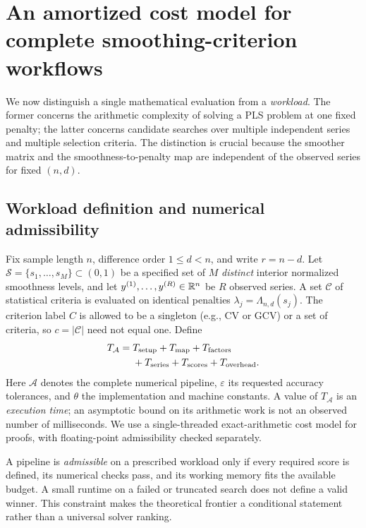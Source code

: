 \section{An amortized cost model for complete smoothing-criterion workflows}
\label{sec:amortized}
We now distinguish a single mathematical evaluation from a
\emph{workload}. The former concerns the arithmetic complexity of
solving a PLS problem at one fixed penalty; the latter concerns
candidate searches over multiple independent series and multiple
selection criteria. The distinction is crucial because the
smoother matrix and the smoothness-to-penalty map are independent
of the observed series for fixed $(n,d)$.

\subsection{Workload definition and numerical admissibility}
Fix sample length $n$, difference order $1\le d<n$, and write
$r=n-d$. Let $\mathcal{S}=\{s_1,\ldots,s_M\}\subset(0,1)$
be a specified set of $M$ \emph{distinct} interior normalized
smoothness levels, and let $y^{(1)},\ldots,y^{(R)}\in\mathbb R^n$
be $R$ observed series. A set $\mathcal C$ of statistical
criteria is evaluated on identical penalties
$\lambda_j=\Lambda_{n,d}(s_j)$.
The criterion label $C$ is allowed to be a singleton
(e.g., CV or GCV) or a set of criteria, so
$c=|\mathcal C|$ need not equal one. Define
\begin{equation}\label{eq:theory_cost_function}
\begin{aligned}
T_{\mathcal A}
={}&T_{\rm setup}+T_{\rm map}+T_{\rm factors}\\
&+T_{\rm series}+T_{\rm scores}+T_{\rm overhead}.
\end{aligned}
\end{equation}
Here $\mathcal A$ denotes the complete numerical pipeline,
$\varepsilon$ its requested accuracy tolerances, and $\theta$
the implementation and machine constants. A value of
$T_{\mathcal A}$ is an \emph{execution time}; an asymptotic bound
on its arithmetic work is not an observed number of
milliseconds. We use a single-threaded exact-arithmetic
cost model for proofs, with floating-point admissibility
checked separately.

A pipeline is \emph{admissible} on a prescribed workload only
if every required score is defined, its numerical checks pass,
and its working memory fits the available budget. A small
runtime on a failed or truncated search does not define a
valid winner. This constraint makes the theoretical
frontier a conditional statement rather than a universal
solver ranking.

